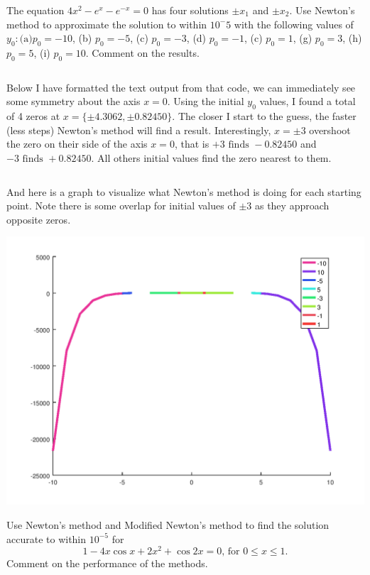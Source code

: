 \documentclass[10pt]{jhwhw}
\begin{document}
\problem{}

	The equation $4x^2 - e^x - e^{-x} = 0$ has four solutions $\pm x_1$ and $\pm x_2$.
	Use Newton's method to approximate the solution to within $10^-5$ with the following values of
	$y_0: \text{(a)} p_0 = -10$, (b) $p_0 = -5$, (c) $p_0 = -3$, (d) $p_0 = -1$, (c) $p_0 = 1$, 
	(g) $p_0 = 3$, (h) $p_0 = 5$, (i) $p_0 = 10$. Comment on the results.

\solution

	\inputminted{octave}{p4.m}
	Below I have formatted the text output from that code, we can immediately see
	some symmetry about the axis $x=0$. Using the initial $y_0$ values, I found
	a total of 4 zeros at $x=\{\pm4.3062, \pm0.82450\}$.
	The closer I start to the guess, the faster (less steps) Newton's method will
	find a result. Interestingly, $x=\pm3$ overshoot the zero on their side
	of the axis $x=0$, that is $+3\text{ finds }-0.82450$ and $-3\text{ finds }+0.82450$.
	All others initial values find the zero nearest to them.

	\inputminted{text}{p4.results}

	\clearpage
	And here is a graph to visualize what Newton's method is doing for each starting point.
	Note there is some overlap for initial values of $\pm3$ as they approach
	opposite zeros.
	\begin{center}
		\includegraphics[scale=0.8]{p4.png}
	\end{center}

\problem{}

	Use Newton's method and Modified Newton's method to find the solution accurate to 
	within $10^{-5}$ for
	$$
		1 - 4x\cos x + 2x^2 + \cos 2x = 0\text{, for }0 \leq x \leq 1.
	$$
	Comment on the performance of the methods.
\end{document}
